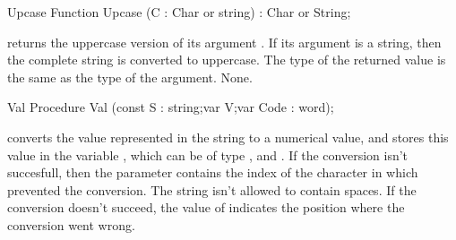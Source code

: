 \documentclass{report}
\begin{document}

\begin{function}{Upcase}
\Declaration
Function Upcase (C : Char or string) : Char or String;

\Description
{} returns the uppercase version of its argument .
If its argument is a string, then the complete string is converted to
uppercase. The type of the returned value is the same as the type of the
argument.
\Errors
None.
\SeeAlso
{}
\end{function}


\begin{procedure}{Val}
\Declaration
Procedure Val (const S : string;var V;var Code : word);

\Description
{} converts the value represented in the string  to a numerical
value, and stores this value in the variable , which
can be of type ,  and .
If the conversion isn't succesfull, then the parameter  contains
the index of the character in  which prevented the conversion.
The string  isn't allowed to contain spaces.
\Errors
If the conversion doesn't succeed, the value of  indicates the
position where the conversion went wrong.
\SeeAlso
{}
\end{procedure}

\end{document}
